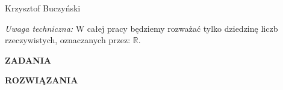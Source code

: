 \documentclass[a4paper,12pt, twoside]{article}
\theoremstyle{definition}
\begin{document}
\begin{flushright} Krzysztof Buczyński \end{flushright}

\vspace*{5cm}
\textit{Uwaga techniczna:} W całej pracy będziemy rozważać tylko dziedzinę liczb rzeczywistych, oznaczanych przez: $\mathbb{R}.$



\newpage
\vspace*{\fill} %
\begin{center}
    \textbf{\Huge  ZADANIA}
\end{center}
\vspace*{\fill} %






\newpage
\vspace*{\fill} %
\begin{center}
    \textbf{\Huge  ROZWIĄZANIA}
\end{center}
\vspace*{\fill} %















    
\end{document}
